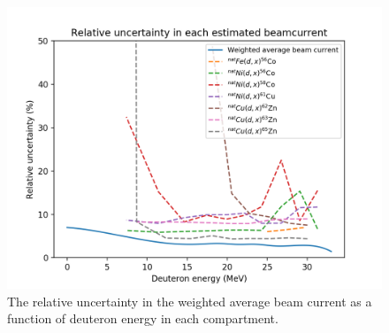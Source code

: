 \begin{figure}
    \centering
    \includegraphics{Analysis/rel_unc_BC.png}
    \caption{The relative uncertainty in the weighted average beam current as a function of deuteron energy in each compartment. }
    \label{fig:rel_unc_BC}
\end{figure}


